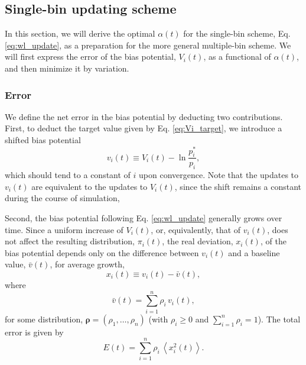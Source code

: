 \documentclass[reprint, superscriptaddress, floatfix]{revtex4-1}
\newcommand{\Err}{E}
\begin{document}
\subsection{\label{sec:single-bin}
Single-bin updating scheme}



In this section,
we will derive the optimal $\alpha(t)$
for the single-bin scheme,
Eq. \eqref{eq:wl_update},
as a preparation
for the more general multiple-bin scheme.
%
%
We will first express the error of
the bias potential, $V_i(t)$,
as a functional of $\alpha(t)$,
and then minimize it by variation.
%



\subsubsection{Error}



We define the net error in the bias potential
by deducting two contributions.
%
First, to deduct the target value given by
Eq. \eqref{eq:Vi_target},
we introduce a shifted bias potential
%
\begin{equation}
  v_i(t)
  \equiv
  V_i(t)
  -
  \ln \frac { p^*_i }
            { p_i }
  ,
  \label{eq:v_def}
\end{equation}
%
which should tend to a constant of $i$
upon convergence.
Note that the updates to $v_i(t)$ are
equivalent to the updates to $V_i(t)$,
since the shift
remains a constant during the course of simulation,


Second, the bias potential following Eq. \eqref{eq:wl_update}
generally grows over time.
%
Since a uniform increase of $V_i(t)$, or, equivalently, that of $v_i(t)$,
does not affect the
resulting distribution, $\pi_i(t)$,
%
the real deviation, $x_i(t)$, of the bias potential
depends only on the difference between $v_i(t)$
and a baseline value, $\bar v(t)$,
for average growth\cite{
dama2014},
%
\begin{equation}
  x_i(t) \equiv v_i(t) - \bar v(t)
  ,
\label{eq:x_def}
\end{equation}
%
where
%
\begin{equation}
  \bar v(t)
  = \sum_{i = 1}^n \rho_i \, v_i(t)
  ,
\label{eq:vbar_def}
\end{equation}
for some distribution,
$\pmb \rho = (\rho_1, \dots, \rho_n)$
(with $\rho_i \ge 0$ and $\sum_{i = 1}^n \rho_i = 1$).
%
The total error is given by
%
\begin{equation}
  \Err(t)
  =
  \sum_{i = 1}^n \rho_i \, \left\langle x_i^2(t) \right\rangle
  .
\label{eq:error_def}
\end{equation}
\end{document}

